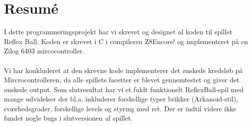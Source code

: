 \chapter{Resumé}

I dette programmeringsprojekt har vi skrevet og designet al koden til spillet Reflex Ball. Koden er skrevet i C i compileren Z8Encore! og implementeret på en Zilog 6403 mircocontroller. \\ \\
Vi har konkluderet at den skrevne kode implementerer det ønskede kredsløb på Mircrocontrolleren, da alle spillets facetter er blevet gennemtestet og giver det ønskede output. Som slutresultat har vi et fuldt funktionelt ReflexBall-spil med mange udvidelser der bl.a. inkluderer forskellige typer brikker (Arkanoid-stil), sværhedsgrader, forskellige levels og styring med ret. Der er indtil videre ikke fundet nogle bugs i slutversionen af spillet.\\ \\